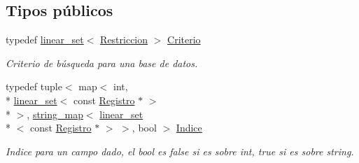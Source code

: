 \subsection*{Tipos públicos}
\begin{DoxyCompactItemize}
\item 
\hypertarget{classBaseDeDatos_a6742a222e87623bc92a810a693fb337b}{typedef \hyperlink{classlinear__set}{linear\-\_\-set}$<$ \hyperlink{classRestriccion}{Restriccion} $>$ \hyperlink{classBaseDeDatos_a6742a222e87623bc92a810a693fb337b}{Criterio}}\label{classBaseDeDatos_a6742a222e87623bc92a810a693fb337b}

\begin{DoxyCompactList}\small\item\em Criterio de búsqueda para una base de datos. \end{DoxyCompactList}\item 
\hypertarget{classBaseDeDatos_a5672205542180582d4fb39817e6753e0}{typedef tuple$<$ map$<$ int, \\*
\hyperlink{classlinear__set}{linear\-\_\-set}$<$ const \hyperlink{classRegistro}{Registro} $\ast$ $>$\\*
 $>$, \hyperlink{classstring__map}{string\-\_\-map}$<$ \hyperlink{classlinear__set}{linear\-\_\-set}\\*
$<$ const \hyperlink{classRegistro}{Registro} $\ast$ $>$ $>$, bool $>$ \hyperlink{classBaseDeDatos_a5672205542180582d4fb39817e6753e0}{Indice}}\label{classBaseDeDatos_a5672205542180582d4fb39817e6753e0}

\begin{DoxyCompactList}\small\item\em Indice para un campo dado, el bool es false si es sobre int, true si es sobre string. \end{DoxyCompactList}\end{DoxyCompactItemize}
